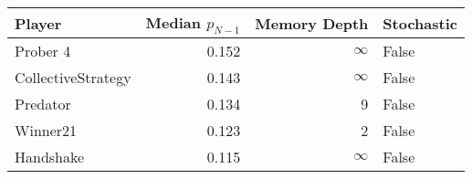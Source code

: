 \begin{tabular}{lrrl}
\toprule
             Player &  Median $p_{N-1}$ &  Memory Depth & Stochastic \\
\midrule
           Prober 4 &             0.152 &            \(\infty\) &      False \\
 CollectiveStrategy &             0.143 &            \(\infty\) &      False \\
           Predator &             0.134 &             9 &      False \\
           Winner21 &             0.123 &             2 &      False \\
          Handshake &             0.115 &            \(\infty\) &      False \\
\bottomrule
\end{tabular}
